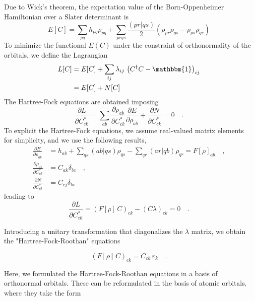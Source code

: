 \documentclass{article}
\begin{document}
Due to Wick's theorem, the expectation value of the Born-Oppenheimer Hamiltonian over a Slater determinant is
\begin{equation}
E[C] = \sum_{pq} h_{pq} \rho_{pq} +\sum_{prqs}  \frac{(pr|qs)}{2} \left( \rho_{pr} \rho_{qs} -
\rho_{ps} \rho_{qr} \right)
\end{equation}
To minimize the functional $E(C)$ under the constraint of orthonormality of the orbitals, we define the Lagrangian
\begin{equation}
\begin{split}
L[C] &= E[C] + \sum_{ij} \lambda_{ij} \, \left( C^\dagger C - \mathbbm{1} \right)_{ij} \\
&= E[C] + N[C]
\end{split}
\end{equation}
The Hartree-Fock equations are obtained imposing
\begin{equation}
\frac{\partial L}{\partial C^*_{ck}}
=
\sum_{ab} \frac{\partial \rho_{ab}}{\partial C^*_{ck}} 
\frac{\partial E}{\partial \rho_{ab}}
+
\frac{\partial N}{\partial C^*_{ck}}
= 0
\quad.
\end{equation}
To explicit the Hartree-Fock equations, we assume real-valued matrix elements for simplicity, and we use the following results,
\begin{equation}
\begin{split}
\frac{\partial E}{\partial \rho_{ab}} &= h_{ab} + \sum_{qs} (ab|qs) \rho_{qs} - \sum_{qr} (ar|qb) \rho_{qr} = F[\rho]_{ab} \quad, \\
\frac{\partial \rho_{ab}}{\partial C^*_{ck}} &= C_{ak} \delta_{bc} \quad, \\
\frac{\partial N}{\partial C^*_{ck}} &= C_{cj} \delta_{ki}
\end{split}
\end{equation}
leading to
\begin{equation}
\frac{\partial L}{\partial C^*_{ck}}
=
\left( F[\rho] \, C \right)_{ck} - \left( C \lambda \right)_{ck} = 0 \quad.
\end{equation}

Introducing a unitary transformation that diagonalizes the $\lambda$ matrix, we obtain the "Hartree-Fock-Roothan" equations

\begin{equation}
\left( F[\rho] \, C \right)_{ck} = C_{ck} \, \varepsilon_k \quad .
\end{equation}

Here, we formulated the Hartree-Fock-Roothan equations in a basis of orthonormal orbitals. 
These can be reformulated in the basis of atomic orbitals, where they take the form
\end{document}
